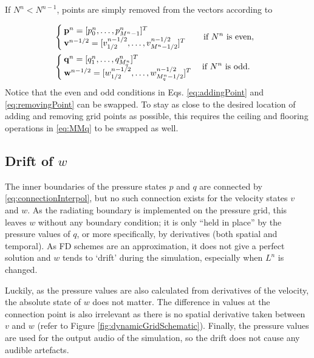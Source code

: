 If $N^n < N^{n-1}$, points are simply removed from the vectors according to

\begin{equation}\label{eq:removingPoint}
    \begin{aligned}
        &\!\!\!\!\!\!\begin{cases}
            \mathbf{p}^n = [p_0^n, \hdots, p_{M^n-1}^n]^T\\
            \mathbf{v}^{n-1/2} = [v_{1/2}^{n-1/2}, \hdots, v_{M^n-1/2}^{n-1/2}]^T
        \end{cases}
        \quad\!\text{if $N^n$ is even},\\
        &\!\!\!\!\!\!\begin{cases}
            \mathbf{q}^n = [q_1^n, \hdots, q_{M_q^n}^n]^T\\
            \mathbf{w}^{n-1/2} = [w_{1/2}^{n-1/2},\hdots, w_{M_q^n-1/2}^{n-1/2}]^T
        \end{cases}\text{if $ N^n$ is odd}.
    \end{aligned}
\end{equation}
Notice that the even and odd conditions in Eqs. \eqref{eq:addingPoint} and \eqref{eq:removingPoint} can be swapped. To stay as close to the desired location of adding and  removing grid points as possible, this requires the ceiling and flooring operations in \eqref{eq:MMq} to be swapped as well.
\subsection{Drift of $w$}\label{sec:drift}
The inner boundaries of the pressure states $p$ and $q$ are connected by \eqref{eq:connectionInterpol}, but no such connection exists for the velocity states $v$ and $w$. As the radiating boundary is implemented on the pressure grid,  this leaves $w$ without any boundary condition; it is only ``held in place'' by the pressure values of $q$, or more specifically, by derivatives (both spatial and temporal). As FD schemes are an approximation, it does not give a perfect solution and $w$ tends to `drift' during the simulation, especially when $L^n$ is changed.

Luckily, as the pressure values are also calculated from derivatives of the velocity, the absolute state of $w$ does not matter. The difference in values at the connection point is also irrelevant as there is no spatial derivative taken between $v$ and $w$ (refer to Figure \ref{fig:dynamicGridSchematic}). Finally, the pressure values are used for the output audio of the simulation, so the drift does not cause any audible artefacts. 

